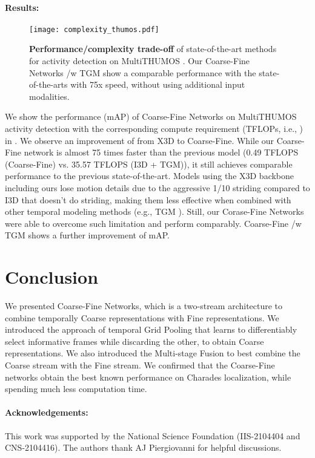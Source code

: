 \documentclass[final]{cvpr}
\begin{document}
\vspace{-3pt}
\paragraph{Results:}
\label{subsubsec:main_results_thumos}






\begin{figure}[t]
	\centering
	\vspace{-2mm}
	\texttt{[image: complexity\_thumos.pdf]}
	\vspace{-1mm}
	\caption{\textbf{Performance/complexity trade-off} of state-of-the-art methods for activity detection on MultiTHUMOS \cite{yeung2018every}. Our Coarse-Fine Networks /w TGM show a comparable performance with the state-of-the-arts with 75x speed, without using additional input modalities.}
	\label{fig:complexity_thumos}
	\vspace{-5mm}
\end{figure}

We show the performance (mAP) of Coarse-Fine Networks on MultiTHUMOS \cite{yeung2018every} activity detection with the corresponding compute requirement (TFLOPs, i.e., ) in . We observe an improvement of  from X3D \cite{feichtenhofer2020x3d} to Coarse-Fine. While our Coarse-Fine network is almost 75 times faster than the previous model (0.49 TFLOPS (Coarse-Fine) vs. 35.57 TFLOPS (I3D + TGM)), it still achieves comparable performance to the previous state-of-the-art. Models using the X3D backbone including ours lose motion details due to the aggressive 1/10 striding compared to I3D \cite{carreira2017quo} that doesn't do striding, making them less effective when combined with other temporal modeling methods (e.g., TGM \cite{piergiovanni2019temporal}). Still, our Corase-Fine Networks were able to overcome such limitation and perform comparably. Coarse-Fine /w TGM shows a further improvement of mAP.






\vspace{-2mm}
\section{Conclusion}
\vspace{-2mm}

We presented Coarse-Fine Networks, which is a two-stream architecture to combine temporally Coarse representations with Fine representations.
We introduced the approach of temporal Grid Pooling that learns to differentiably select informative frames while discarding the other, to obtain Coarse representations. We also introduced the Multi-stage Fusion to best combine the Coarse stream with the Fine stream. We confirmed that the Coarse-Fine networks obtain the best known performance on Charades localization, while spending much less computation time.

\paragraph{Acknowledgements:} This work was supported by the National Science Foundation (IIS-2104404 and CNS-2104416). The authors thank AJ Piergiovanni for helpful discussions.





{\small
\balance


}
\end{document}

